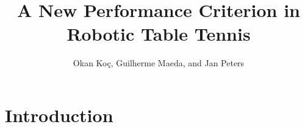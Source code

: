 \documentclass[10pt,a4paper]{article}
\author{Okan Ko\c c, Guilherme Maeda, and Jan Peters}
\title{A New Performance Criterion in Robotic Table Tennis}
\begin{document}
\maketitle


\section{Introduction}


%
%
%
%
%
%
\end{document}
